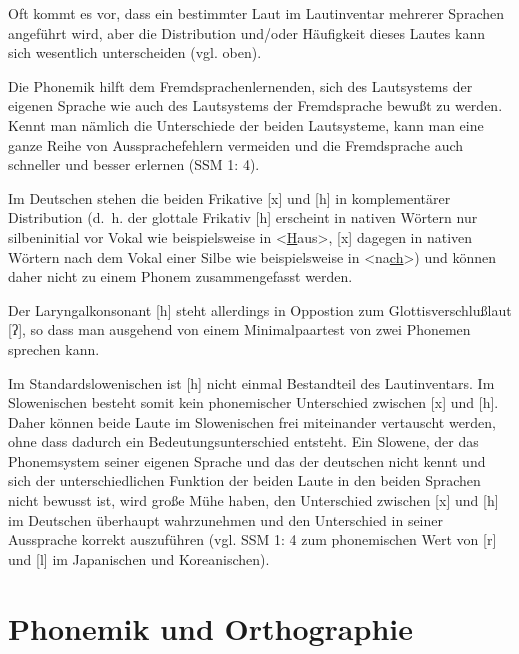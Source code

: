 \documentclass[
  letterpaper,
]{scrbook}
\begin{document}
Oft kommt es vor, dass ein bestimmter Laut im Lautinventar mehrerer
Sprachen angeführt wird, aber die Distribution und/oder Häufigkeit
dieses Lautes kann sich wesentlich unterscheiden (vgl. oben).

Die Phonemik hilft dem Fremdsprachenlernenden, sich des Lautsystems der
eigenen Sprache wie auch des Lautsystems der Fremdsprache bewußt zu
werden. Kennt man nämlich die Unterschiede der beiden Lautsysteme, kann
man eine ganze Reihe von Aussprachefehlern vermeiden und die
Fremdsprache auch schneller und besser erlernen (SSM 1: 4).

Im Deutschen stehen die beiden Frikative {[}x{]} und {[}h{]} in
komplementärer Distribution (d.~h. der glottale Frikativ {[}h{]}
erscheint in nativen Wörtern nur silbeninitial vor Vokal wie
beispielsweise in \textless{}\uline{H}aus\textgreater, {[}x{]} dagegen
in nativen Wörtern nach dem Vokal einer Silbe wie beispielsweise in
\textless na\uline{ch}\textgreater) und können daher nicht zu einem
Phonem zusammengefasst werden.

Der Laryngalkonsonant {[}h{]} steht allerdings in Oppostion zum
Glottisverschlußlaut {[}ʔ{]}, so dass man ausgehend von einem
Minimalpaartest von zwei Phonemen sprechen kann.

Im Standardslowenischen ist {[}h{]} nicht einmal Bestandteil des
Lautinventars. Im Slowenischen besteht somit kein phonemischer
Unterschied zwischen {[}x{]} und {[}h{]}. Daher können beide Laute im
Slowenischen frei miteinander vertauscht werden, ohne dass dadurch ein
Bedeutungsunterschied entsteht. Ein Slowene, der das Phonemsystem seiner
eigenen Sprache und das der deutschen nicht kennt und sich der
unterschiedlichen Funktion der beiden Laute in den beiden Sprachen nicht
bewusst ist, wird große Mühe haben, den Unterschied zwischen {[}x{]} und
{[}h{]} im Deutschen überhaupt wahrzunehmen und den Unterschied in
seiner Aussprache korrekt auszuführen (vgl. SSM 1: 4 zum phonemischen
Wert von {[}r{]} und {[}l{]} im Japanischen und Koreanischen).

\hypertarget{phonemik-und-orthographie}{%
\section{Phonemik und Orthographie}\label{phonemik-und-orthographie}}
\end{document}
